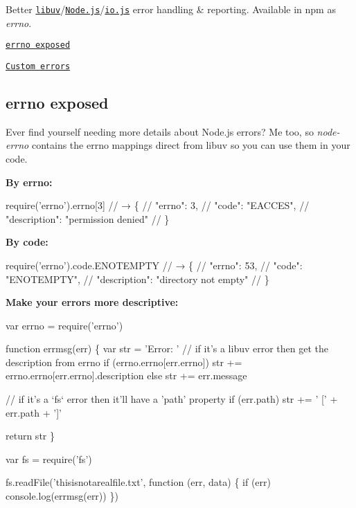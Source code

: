 Better \href{https://github.com/libuv/libuv}{\tt libuv}/\href{https://nodejs.org}{\tt Node.\+js}/\href{https://iojs.org}{\tt io.\+js} error handling \& reporting. Available in npm as {\itshape errno}.


\begin{DoxyItemize}
\item \href{#errnoexposed}{\tt errno exposed}
\item \href{#customerrors}{\tt Custom errors}
\end{DoxyItemize}

\label{_errnoexposed}%
 \subsection*{errno exposed}

Ever find yourself needing more details about Node.\+js errors? Me too, so {\itshape node-\/errno} contains the errno mappings direct from libuv so you can use them in your code.

{\bfseries By errno\+:}


\begin{DoxyCode}
require('errno').errno[3]
// → \{
//     "errno": 3,
//     "code": "EACCES",
//     "description": "permission denied"
//   \}
\end{DoxyCode}


{\bfseries By code\+:}


\begin{DoxyCode}
require('errno').code.ENOTEMPTY
// → \{
//     "errno": 53,
//     "code": "ENOTEMPTY",
//     "description": "directory not empty"
//   \}
\end{DoxyCode}


{\bfseries Make your errors more descriptive\+:}


\begin{DoxyCode}
var errno = require('errno')

function errmsg(err) \{
  var str = 'Error: '
  // if it's a libuv error then get the description from errno
  if (errno.errno[err.errno])
    str += errno.errno[err.errno].description
  else
    str += err.message

  // if it's a `fs` error then it'll have a 'path' property
  if (err.path)
    str += ' [' + err.path + ']'

  return str
\}

var fs = require('fs')

fs.readFile('thisisnotarealfile.txt', function (err, data) \{
  if (err)
    console.log(errmsg(err))
\})
\end{DoxyCode}


